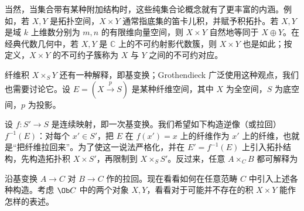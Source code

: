 当然，当集合带有某种附加结构时，这些纯集合论概念就有了更丰富的内涵。例如，若 $X,Y$ 是拓扑空间，$X\times Y$ 通常指底集的笛卡儿积，并赋予积拓扑。若 $X,Y$ 是域 $k$ 上维数分别为 $m,n$ 的有限维向量空间，则 $X\times Y$ 自然地等同于 $X\oplus Y$。在经典代数几何中，若 $X,Y$ 是 $\mathbb C$ 上的不可约射影代数簇，则 $X\times Y$ 也是如此；按定义，$X\times Y$ 的不可约子簇称为 $X$ 与 $Y$ 之间的不可约对应。

纤维积 $X\times_S Y$ 还有一种解释，即基变换；Grothendieck 广泛使用这种观点，我们也需要讨论它。设 $E=(X\xrightarrow p S)$ 是某种纤维空间，其中 $X$ 为全空间，$S$ 为底空间，$p$ 为投影。
\begin{center}
\end{center}
设 $f:S'\to S$ 是连续映射，即一次基变换。我们希望如下构造逆像（或拉回）$f^{-1}(E)$：对每个 $x'\in S'$，把 $E$ 在 $f(x')=x$ 上的纤维作为 $x'$ 上的纤维，也就是“把纤维拉回来”。为了使这一说法严格化，并在 $E'=f^{-1}(E)$ 上引入拓扑结构，先构造拓扑积 $X\times S'$，再限制到 $X\times_S S'$。反过来，任意 $A\times_C B$ 都可解释为

沿基变换 $A\to C$ 对 $B\to C$ 作的拉回。现在看看如何在任意范畴 $C$ 中引入上述各种构造。考虑 $\Ob C$ 中的两个对象 $X,Y$，看看对于可能并不存在的积 $X\times Y$ 能作怎样的表述。

